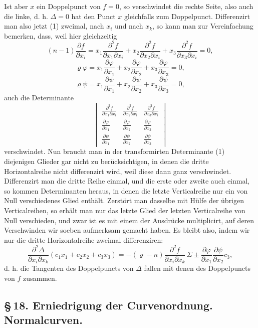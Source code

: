\documentclass[10pt]{article}
\begin{document}
Ist aber \(x\) ein Doppelpunct von \(f=0\), so verschwindet die rechte Seite, also auch die linke, d. h. \(\Delta=0\) hat den Punct \(x\) gleichfalls zum Doppelpunct. Differenzirt man also jetzt (1) zweimal, nach \(x_i\) und nach \(x_k\), so kann man zur Vereinfachung bemerken, dass, weil hier gleichzeitig
\[
(n-1)\frac{\partial f}{\partial x_i}
=x_1\frac{\partial^2 f}{\partial x_1\partial x_i}
+x_2\frac{\partial^2 f}{\partial x_2\partial x_i}
+x_3\frac{\partial^2 f}{\partial x_3\partial x_i}=0,
\]
\[
\varrho\varphi
=x_1\frac{\partial\varphi}{\partial x_1}
+x_2\frac{\partial\varphi}{\partial x_2}
+x_3\frac{\partial\varphi}{\partial x_3}=0,
\]
\[
\varrho\psi
=x_1\frac{\partial\psi}{\partial x_1}
+x_2\frac{\partial\psi}{\partial x_2}
+x_3\frac{\partial\psi}{\partial x_3}=0,
\]
auch die Determinante
\[
\begin{vmatrix}
\frac{\partial^2 f}{\partial x_1\partial x_i}&
\frac{\partial^2 f}{\partial x_2\partial x_i}&
\frac{\partial^2 f}{\partial x_3\partial x_i}\\
\frac{\partial\varphi}{\partial x_1}&
\frac{\partial\varphi}{\partial x_2}&
\frac{\partial\varphi}{\partial x_3}\\
\frac{\partial\psi}{\partial x_1}&
\frac{\partial\psi}{\partial x_2}&
\frac{\partial\psi}{\partial x_3}
\end{vmatrix}
\]
verschwindet. Nun braucht man in der transformirten Determinante (1) diejenigen Glieder gar nicht zu berücksichtigen, in denen die dritte Horizontalreihe nicht differenzirt wird, weil diese dann ganz verschwindet. Differenzirt man die dritte Reihe einmal, und die erste oder zweite auch einmal, so kommen Determinanten heraus, in denen die letzte Verticalreihe nur ein von Null verschiedenes Glied enthält. Zerstört man dasselbe mit Hülfe der übrigen Verticalreihen, so erhält man nur das letzte Glied der letzten Verticalreihe von Null verschieden, und zwar ist es mit einem der Ausdrücke multiplicirt, auf deren Verschwinden wir soeben aufmerksam gemacht haben. Es bleibt also, indem wir nur die dritte Horizontalreihe zweimal differenziren:
\[
\frac{\partial^2\Delta}{\partial x_i\partial x_k}
(c_1x_1+c_2x_2+c_3x_3)
=-(\varrho-n)\frac{\partial^2f}{\partial x_i\partial x_k}
\,\Sigma\pm
\frac{\partial\varphi}{\partial x_1}
\frac{\partial\psi}{\partial x_2}c_3,
\]
d. h. die Tangenten des Doppelpuncts von \(\Delta\) fallen mit denen des Doppelpuncts von \(f\) zusammen.

\subsection*{\S\,18. Erniedrigung der Curvenordnung. Normalcurven.}
\end{document}
